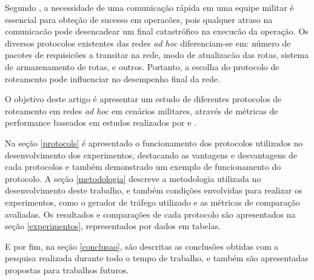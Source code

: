 Segundo \cite{salles}, a necessidade de uma comunica\c{c}\~ao r\'apida em uma equipe militar \'e essencial para obte\c{c}\~ao de sucesso em operac\~oes, pois qualquer atraso na comunicac\~ao pode desencadear um final catastr\'ofico na execuc\~ao da opera\c{c}\~ao. 
Os diversos protocolos existentes das redes \textit{ad hoc} diferenciam-se em: n\'umero de pacotes de requisic\~oes a transitar na rede, modo de atualizac\~ao das rotas, sistema de armazenamento de rotas, e outros. 
Portanto, a escolha do protocolo de roteamento pode influenciar no desempenho final da rede.

O objetivo deste artigo \'e apresentar um estudo de diferentes protocolos de roteamento em redes \textit{ad hoc} em cen\'arios militares, atrav\'es de m\'etricas de performance baseados em estudos realizados por \cite{pereira} e \cite{salles}.

Na se\c{c}\~ao \ref{protocols} \'e apresentado o funcionamento dos protocolos utilizados no desenvolvimento dos experimentos, destacando as vantagens e desvantagens de cada protocolos e tamb\'em demonstrado um exemplo de funcionamento do protocolo. 
A se\c{c}\~ ao \ref{metodologia} descreve a metodologia utilizada no desenvolvimento deste trabalho, e tamb\'em condi\c{c}\~oes envolvidas para realizar os experimentos, como o gerador de tr\'afego utilizado e as m\'etricas de compara\c{c}\~ao avaliadas.
Os resultados e compara\c{c}\~oes de cada protocolo s\~ao apresentados na se\c{c}\~ao \ref{experimentos}, representados por dados em tabelas.

E por fim, na se\c{c}\~ao \ref{conclusao}, s\~ao descritas as conclus\~oes obtidas com a pesquisa realizada durante todo o tempo de trabalho, e tamb\'em s\~ao apresentadas propostas para trabalhos futuros.
